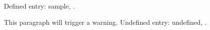 \documentclass{article}
\begin{document}
Defined entry: \gls{sample}, .

This paragraph will trigger a warning.
Undefined entry: \gls{undefined}, .

\printglossaries
\end{document}

